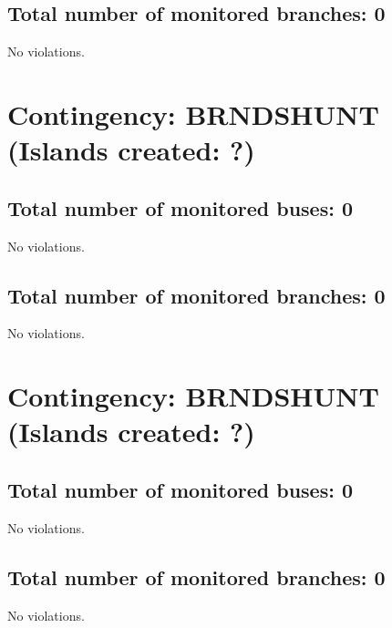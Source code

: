 \documentclass{article}%
\begin{document}
%
\subsection*{Total number of monitored branches: 0}%
\label{subsec:Totalnumberofmonitoredbranches0}%
No violations.

%
\maketitle%
\section*{Contingency: BRNDSHUNT (Islands created: ?)}%
\label{sec:ContingencyBRNDSHUNT(Islandscreated?)}%
\subsection*{Total number of monitored buses: 0}%
\label{subsec:Totalnumberofmonitoredbuses0}%
No violations.

%
\subsection*{Total number of monitored branches: 0}%
\label{subsec:Totalnumberofmonitoredbranches0}%
No violations.

%
\maketitle%
\section*{Contingency: BRNDSHUNT (Islands created: ?)}%
\label{sec:ContingencyBRNDSHUNT(Islandscreated?)}%
\subsection*{Total number of monitored buses: 0}%
\label{subsec:Totalnumberofmonitoredbuses0}%
No violations.

%
\subsection*{Total number of monitored branches: 0}%
\label{subsec:Totalnumberofmonitoredbranches0}%
No violations.

%
\maketitle%
\end{document}
